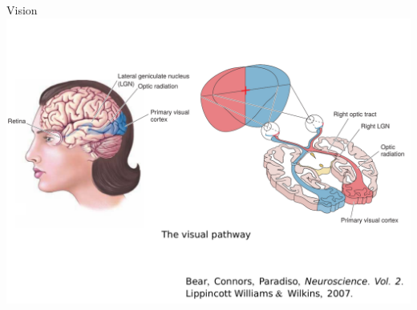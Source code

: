 \documentclass[xcolor=x11names,compress]{beamer}
\renewcommand{\(}{\begin{columns}}
\renewcommand{\)}{\end{columns}}
\newcommand{\<}[1]{\begin{column}{#1}}
\renewcommand{\>}{\end{column}}
\begin{document}
\begin{frame}[t]{Vision}
    \includegraphics[height=0.9\textheight]{visual_pathway}
\end{frame}
\end{document}
